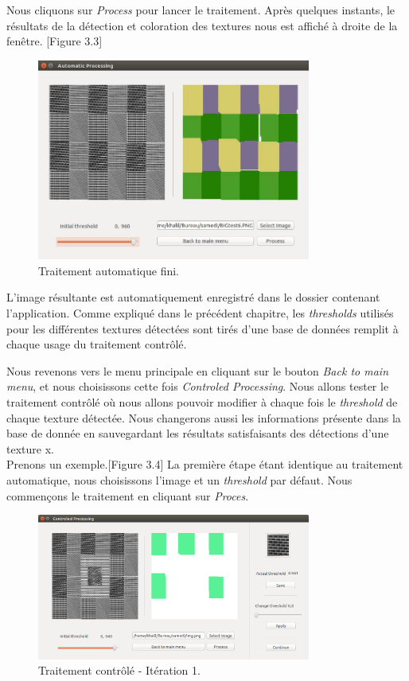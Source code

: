 \indent Nous cliquons sur \textit{Process} pour lancer le traitement.
Après quelques instants, le résultats de la détection et coloration des textures nous est affiché à droite de la fenêtre. [Figure 3.3]

\begin{figure}[H]
	\centering
		\includegraphics[width=9cm,]{Figures/chap3/5.jpg}
	\caption[traitementAutofin]{Traitement automatique fini.}
	\label{fig:traitementAutofin}
\end{figure}

\indent L'image résultante est automatiquement enregistré dans le dossier contenant l'application. Comme expliqué dans le précédent chapitre, les \textit{thresholds} utilisés pour les différentes textures détectées sont tirés d'une base de données remplit à chaque usage du traitement contrôlé.

\indent Nous revenons vers le menu principale en cliquant sur le bouton \textit{Back to main menu}, et nous choisissons cette fois \textit{Controled Processing}.
Nous allons tester le traitement contrôlé où nous allons pouvoir modifier à chaque fois le \textit{threshold} de chaque texture détectée. Nous changerons aussi les informations présente dans la base de donnée en sauvegardant les résultats satisfaisants des détections d'une texture x.\\
\indent Prenons un exemple.[Figure 3.4] La première étape étant identique au traitement automatique, nous choisissons l'image et un \textit{threshold} par défaut. Nous commençons le traitement en cliquant sur \textit{Proces}.


\begin{figure}[H]
	\centering
		\includegraphics[width=9cm,]{Figures/chap3/Capture4343.png}
	\caption[traitementAutofin]{Traitement contrôlé - Itération 1.}
	\label{fig:traitementAutofin}
\end{figure}


